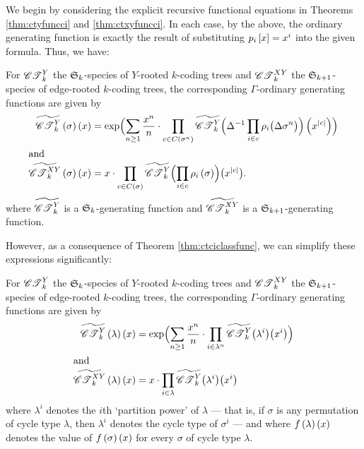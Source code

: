 \documentclass[distribution,draft]{brandiss} %
\numberwithin{section}{chapter}
\numberwithin{figure}{chapter}
\begin{document}
We begin by considering the explicit recursive functional equations in Theorems \ref{thm:ctyfuncci} and \ref{thm:ctxyfuncci}.
In each case, by the above, the ordinary generating function is exactly the result of substituting $p_{i} \left[ {x} \right] = x^{i}$ into the given formula.
Thus, we have:
\begin{theorem}
  \label{thm:ctrhoogf}
  For $\mathscr{CT}_{k}^{Y}$ the $ \mathfrak{S}_{k} $-species of $Y$-rooted $k$-coding trees and $\mathscr{CT}_{k}^{XY}$ the $ \mathfrak{S}_{k+1} $-species of edge-rooted $k$-coding trees, the corresponding $\Gamma$-ordinary generating functions are given by
  \begin{subequations}
    \label{eq:ctrhoogf}
    \begin{align}
      \widetilde{\cty{k}} \pbrac{\sigma} \pbrac{x} &= \exp \pbracs[Big]{ \sum_{n \geq 1} \frac{x^{n}}{n} \cdot \prod_{c \in C \pbrac{\sigma^{n}}} \widetilde{\cty{k}} \pbracs[Big]{\Delta^{-1} \prod_{i \in c} \rho_{i} \pbracs[big]{\Delta \sigma^{n}}} \pbrac{x^{\abs{c}}}} \label{eq:ctyrhoogf} \\
      \intertext{and}
      \widetilde{\ctxy{k}} \pbrac{\sigma} \pbrac{x} &= x \cdot \prod_{c \in C \pbrac{\sigma}} \widetilde{\cty{k}} \pbracs[Big]{\prod_{i \in c} \rho_{i} \pbrac{\sigma}} \pbracs[big]{x^{\abs{c}}}. \label{eq:ctxyrhoogf}
    \end{align}
  \end{subequations}
  where $\widetilde{\mathscr{CT}_{k}^{Y}}$ is a $ \mathfrak{S}_{k} $-generating function and $\widetilde{\mathscr{CT}_{k}^{XY}}$ is a $ \mathfrak{S}_{k+1} $-generating function.
\end{theorem}

However, as a consequence of Theorem \ref{thm:ctciclassfunc}, we can simplify these expressions significantly:
\begin{corollary}
  \label{cor:ctogf}
  For $\mathscr{CT}_{k}^{Y}$ the $ \mathfrak{S}_{k} $-species of $Y$-rooted $k$-coding trees and $\mathscr{CT}_{k}^{XY}$ the $ \mathfrak{S}_{k+1} $-species of edge-rooted $k$-coding trees, the corresponding $\Gamma$-ordinary generating functions are given by
  \begin{subequations}
    \label{eq:ctogf}
    \begin{align}
      \widetilde{\cty{k}} \pbrac{\lambda} \pbrac{x} &= \exp \pbracs[Big]{\sum_{n \geq 1} \frac{x^{n}}{n} \cdot \prod_{i \in \lambda^{n}} \widetilde{\cty{k}} \pbracs[big]{\lambda^{i}} \pbracs[big]{x^{i}}} \label{eq:ctyogf} \\
      \intertext{and}
      \widetilde{\ctxy{k}} \pbrac{\lambda} \pbrac{x} &= x \cdot \prod_{i \in \lambda} \widetilde{\cty{k}} \pbracs[big]{\lambda^{i}} \pbracs[big]{x^{i}} \label{eq:ctxyogf}
    \end{align}
  \end{subequations}
  where $\lambda^{i}$ denotes the $i$th `partition power' of $\lambda$ --- that is, if $\sigma$ is any permutation of cycle type $\lambda$, then $\lambda^{i}$ denotes the cycle type of $\sigma^{i}$ --- and where $f \left( {\lambda} \right) \left( {x} \right)$ denotes the value of $f \left( {\sigma} \right) \left( {x} \right)$ for every $\sigma$ of cycle type $\lambda$.
\end{corollary}
\end{document}
